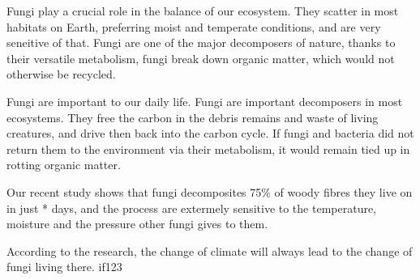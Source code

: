\documentclass[12pt]{article}
\begin{document}
Fungi play a crucial role in the balance of  our ecosystem. They scatter in most habitats on Earth, preferring moist and temperate conditions, and are very seneitive of that. Fungi are one of the major decomposers of nature, thanks to their versatile metabolism, fungi break down organic matter, which would not otherwise be recycled.

Fungi are important to our daily life. Fungi are important decomposers in most ecosystems. They free the carbon in the debris remains and waste of living creatures, and drive then back into the carbon cycle.
If fungi and bacteria did not return them to the environment via their metabolism, it would remain tied up in rotting organic matter.

Our recent study shows that fungi    decomposites 75\% of woody fibres they live on in just * days, and the process are extermely sensitive to the temperature, moisture and the pressure other fungi gives to them. 

According to the research, the change of climate will always lead to the change of fungi living there. if123 
\end{document}
